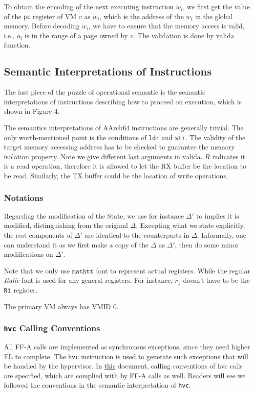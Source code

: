 \documentclass[a4paper]{article}
\newcommand*{\STATE}{\text{State}}
\newcommand*{\VMID}{\text{VMID}}
\newcommand*{\instr}[1]{\texttt{#1}}
\newcommand*{\valida}{\text{valida}}
\begin{document}
To obtain the encoding of the next executing instruction $w_{i}$, we first get the
value of the \texttt{pc} register of VM $v$ as $w_{i}$, which is the address of the
$w_{i}$ in the global memory. Before decoding $w_{i}$, we have to ensure that the
memory access is valid, i.e., $a_{i}$ is in the range of a page owned by $v$.
The validation is done by $\valida$ function.


\subsection{Semantic Interpretations of Instructions}

The last piece of the puzzle of operational semantic
is the semantic interpretations of instructions describing how to proceed on
execution, which is shown in Figure 4.

The semantics interpretations of AArch64 instructions are generally
trivial. The only worth-mentioned point is the conditions of \instr{ldr} and
\instr{str}. The validity of the target memory accessing address has to be
checked to guarantee the memory isolation property. Note we give different last arguments in $\valida$.
$R$ indicates it is a read operation, therefore it is allowed to let the RX buffer be
the location to be read. Similarly, the TX buffer could be the location of write operations.


\subsubsection{Notations}
Regarding the modification of the $\STATE$, we use for instance $\Delta'$ to
implies it is modified, distinguishing from the original $\Delta$. Excepting
what we state explicitly, the rest components of $\Delta'$ are identical to the
counterparts in $\Delta$. Informally, one can understand it as we first make a
copy of the $\Delta$ as $\Delta'$, then do some minor modifications on
$\Delta'$.

Note that we only use $\mathtt{mathtt}$ font to represent actual registers.
While the regular \emph{Italic} font is used for any general registers. For
instance, $r_{1}$ doesn't have to be the $\mathtt{R1}$ register.

The primary VM always has $\VMID$ 0.

\newcommand{\reg}[1]{\texttt{{#1}}}

\subsubsection{\instr{hvc} Calling Conventions}
All FF-A calls are implemented as synchronous exceptions, since they need higher
EL to complete. The \instr{hvc} instruction is used to generate such exceptions
that will be handled by the hypervisor. In
\href{https://developer.arm.com/documentation/den0028/latest}{this} document,
calling conventions of hvc calls are specified, which are complied with by FF-A
calls as well. Readers will see we followed the conventions in the semantic
interpretation of \instr{hvc}.
\end{document}
